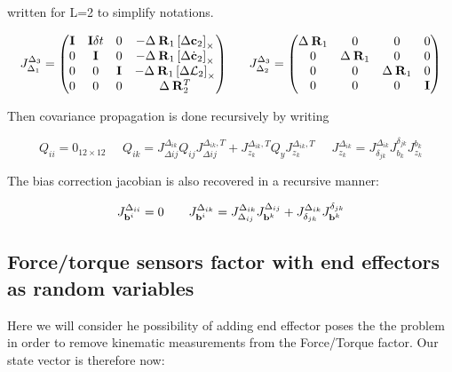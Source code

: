 \documentclass[11pt]{article}
\newcommand{\Rot}[2]{\prescript{#1}{}{\bfR}_{#2}}
\newcommand{\bias}{\bfb}
\newcommand{\AM}{\mathcal{L}}
\newcommand{\COM}{\bfc}
\newcommand{\COMd}{\dot{\bfc}}
\newcommand{\Ident}{\bfI}
\begin{document}
written for L=2 to simplify notations.

\begin{equation}
    J^{\Delta_3}_{\Delta_1} =
    \begin{pmatrix}
    \Ident & \Ident \delta t & 0 & - \Delta \Rot{}{1} \left[\Delta \COM_2 \right]_{\times}
    \\
    0 & \Ident & 0 & - \Delta \Rot{}{1} \left[\Delta \COMd_2 \right]_{\times}
    \\
    0 & 0 & \Ident & - \Delta \Rot{}{1} \left[\Delta \AM_2 \right]_{\times}
    \\
    0 & 0 & 0 & \Delta \Rot{}{2}^T
    \end{pmatrix}
    ~~~~~
    J^{\Delta_3}_{\Delta_2} =
    \begin{pmatrix}
    \Delta \Rot{}{1} & 0 & 0 & 0
    \\
    0 & \Delta \Rot{}{1} & 0 & 0
    \\
    0 & 0 & \Delta \Rot{}{1} & 0
    \\
    0 & 0 & 0 & \Ident
    \end{pmatrix}
\end{equation}


Then covariance propagation is done recursively by writing 

\begin{equation}
    Q_{ii} = 0_{12\times 12} ~~~~~~ Q_{ik} = J^{\Delta_{ik}}_{\Delta {ij}} Q_{ij} J^{\Delta_{ik},T}_{\Delta {ij}} + J^{\Delta_{ik},T}_{z_k} Q_y J^{\Delta_{ik},T}_{z_k}  ~~~~~~ J^{\Delta_{ik}}_{z_k} = J^{\Delta_{ik}}_{\delta_{jk}} J^{\delta_{jk}}_{b_k} J^{b_k}_{z_k}
\end{equation}

The bias correction jacobian is also recovered in a recursive manner:

\begin{equation}
    J^{\Delta_{ii}}_{\bias^i} = 0 ~~~~~~  J^{\Delta_{ik}}_{\bias^i} = J^{\Delta_{ik}}_{\Delta_{ij}} J^{\Delta_{ij}}_{\bias^k} + J^{\Delta_{ik}}_{\delta_{jk}} J^{\delta_{jk}}_{\bias^k}
\end{equation}










\subsection{Force/torque sensors factor with end effectors as random variables}
Here we will consider he possibility of adding end effector poses the the problem in order to remove kinematic measurements from the Force/Torque factor. Our state vector is therefore now:
\end{document}
